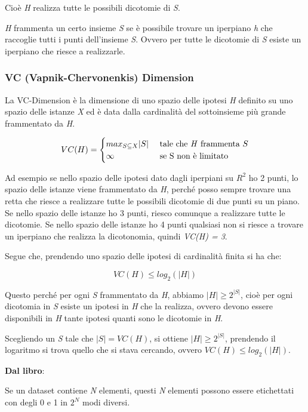 Cioè \emph{H} realizza tutte le possibili dicotomie di \emph{S}.

\emph{H} frammenta un certo insieme \emph{S} se è possibile trovare un
iperpiano \emph{h} che raccoglie tutti i punti dell'insieme \emph{S}. Ovvero per
tutte le dicotomie di \emph{S} esiste un iperpiano che riesce a
realizzarle.

\subsubsection{VC (Vapnik-Chervonenkis) Dimension}\label{vc-vapnik-chervonenkis-dimension}

La VC-Dimension è la dimensione di uno spazio delle ipotesi \emph{H}
definito su uno spazio delle istanze \emph{X} ed è data dalla
cardinalità del sottoinsieme più grande frammentato da \emph{H}.

$$
VC(H) =
\begin{cases}
max_{S \subseteq X} |S|&\text{ tale che \emph{H} frammenta } S  \\
 \infty& \text{ se S non è limitato}
\end{cases}
$$


Ad esempio se nello spazio delle ipotesi dato dagli iperpiani su $R^2$ ho 2 punti, lo spazio delle istanze viene frammentato da
\emph{H}, perché posso sempre trovare una retta che riesce a realizzare
tutte le possibili dicotomie di due punti su un piano.
Se nello spazio delle istanze ho 3 punti, riesco comunque a realizzare
tutte le dicotomie.
Se nello spazio delle istanze ho 4 punti qualsiasi non si riesce a
trovare un iperpiano che realizza la dicotonomia, quindi \emph{VC(H) =
3}.

Segue che, prendendo uno spazio delle ipotesi di cardinalità finita si
ha che:

$$
VC(H) \leq log_2(|H|)
$$

Questo perché per ogni \emph{S} frammentato da \emph{H}, abbiamo
$|H| \geq 2^{|S|}$,
cioè per ogni dicotomia in \emph{S} esiste un ipotesi in \emph{H} che la
realizza, ovvero devono essere disponibili in \emph{H} tante ipotesi
quanti sono le dicotomie in \emph{H}.

Scegliendo un \emph{S} tale che $|S| = VC(H)$, si
ottiene $|H| \geq 2^{|S|}$, prendendo
il logaritmo si trova quello che si stava cercando, ovvero $VC(H) \leq log_2(|H|)$.

\textbf{Dal libro}:

Se un dataset contiene \emph{N} elementi, questi \emph{N} elementi
possono essere etichettati con degli 0 e 1 in $2^N$ modi diversi.

